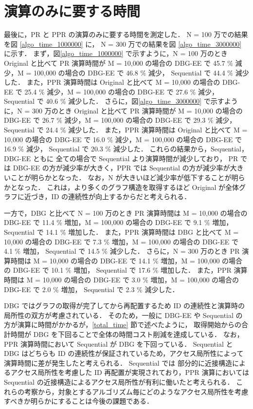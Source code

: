 \section{演算のみに要する時間}
\label{algo_time}
最後に，PR と PPR の演算のみに要する時間を測定した．
N = 100 万での結果を図 \ref{algo_time_1000000} に，
N = 300 万での結果を図 \ref{algo_time_3000000} に示す．
まず，図\ref{algo_time_1000000} で示すように，N = 100 万のとき Original と比べて PR 演算時間が M = 10,000 の場合の DBG-EE で 45.7 \% 減少，M = 100,000 の場合の DBG-EE で 46.8 \% 減少， 
Sequential で 44.4 \% 減少した． 
また，PPR 演算時間は Original と比べて M = 10,000 の場合の DBG-EE で 25.4 \% 減少，M = 100,000 の場合の DBG-EE で 27.6 \% 減少， 
Sequential で 40.6 \% 減少した．
さらに，図\ref{algo_time_3000000} で示すように，N = 300 万のとき Original と比べて PR 演算時間が M = 10,000 の場合の DBG-EE で 26.7 \% 減少，M = 100,000 の場合の DBG-EE で 29.3 \% 減少， 
Sequential で 24.4 \% 減少した．
また，PPR 演算時間は Original と比べて M = 10,000 の場合の DBG-EE で 16.0 \% 減少，M = 100,000 の場合の DBG-EE で 16.9 \% 減少， 
Sequential で 20.3 \% 減少した．
これらの結果から，Sequential，DBG-EE ともに 全ての場合で Sequential より演算時間が減少しており，
PR では DBG-EE の方が減少率が大きく，PPR では Sequential の方が減少率が大きいことが明らかとなった．
なお，N が大きいほど減少率が低下することが明らかとなった．
これは，より多くのグラフ構造を取得するほど Original が全体グラフに近づき，ID の連続性が向上するからだと考えられる．

一方で，DBG と比べて N = 100 万のとき PR 演算時間は M = 10,000 の場合の DBG-EE で 11.4 \% 増加，M = 100,000 の場合の DBG-EE で 9.1 \% 増加， 
Sequential で 14.1 \% 増加した．
また，PPR 演算時間は DBG と比べて M = 10,000 の場合の DBG-EE で 7.3 \% 増加，M = 100,000 の場合の DBG-EE で 4.1 \% 増加， 
Sequential で 14.5 \% 減少した．
さらに，N = 300 万のとき PR 演算時間は M = 10,000 の場合の DBG-EE で 14.1 \% 増加，M = 100,000 の場合の DBG-EE で 10.1 \% 増加， 
Sequential で 17.6 \% 増加した．
また，PPR 演算時間は M = 10,000 の場合の DBG-EE で 3.0 \% 増加，M = 100,000 の場合の DBG-EE で 2.0 \% 増加， 
Sequential で 2.3 \% 減少した．

DBG ではグラフの取得が完了してから再配置するため ID の連続性と演算時の局所性の双方が考慮されている．
そのため，一般に DBG-EE や Sequential の方が演算に時間がかかるが，\ref{total_time} 節で述べたように，
取得開始からの合計時間が DBG を下回ることで全体の時間コスト削減を達成している．
なお，PPR 演算時間において Sequential が DBG を下回っている．
Sequential と DBG はどちらも ID の連続性が保証されているため，アクセス局所性によって演算時間に差が発生したと考えられる．
Sequential では 部分的に近接構造によるアクセス局所性を考慮した ID 再配置が実現されており，PPR 演算においては Sequential の近接構造によるアクセス局所性が有利に働いたと考えられる．
これらの考察から，対象とするアルゴリズム毎にどのようなアクセス局所性を考慮すべきか明らかにすることは今後の課題である．

